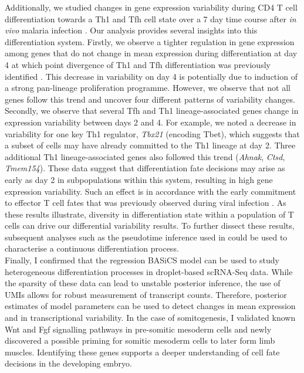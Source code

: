 \newpage

Additionally, we studied changes in gene expression variability during CD4\plus{} T cell differentiation towards a Th1 and Tfh cell state over a 7 day time course after \textit{in vivo} malaria infection \citep{Lonnberg2017}. Our analysis provides several insights into this differentiation system. Firstly, we observe a tighter regulation in gene expression among genes that do not change in mean expression during differentiation at day 4 at which point divergence of Th1 and Tfh differentiation was previously identified \citep{Lonnberg2017}. This decrease in variability on day 4 is potentially due to induction of a strong pan-lineage proliferation programme. However, we observe that not all genes follow this trend and uncover four different patterns of variability changes. Secondly, we observe that several Tfh and Th1 lineage-associated genes change in expression variability between days 2 and 4. For example, we noted a decrease in variability for one key Th1 regulator, \textit{Tbx21} (encoding Tbet), which suggests that a subset of cells may have already committed to the Th1 lineage at day 2. Three additional Th1 lineage-associated genes also followed this trend (\textit{Ahnak}, \textit{Ctsd}, \textit{Tmem154}). These data suggest that differentiation fate decisions may arise as early as day 2 in subpopulations within this system, resulting in high gene expression variability. Such an effect is in accordance with the early commitment to effector T cell fates that was previously observed during viral infection \citep{Choi2011}. As these results illustrate, diversity in differentiation state within a population of T cells can drive our differential variability results. To further dissect these results, subsequent analyses such as the pseudotime inference used in \cite{Lonnberg2017} could be used to characterise a continuous differentiation process.\\

Finally, I confirmed that the regression BASiCS model can be used to study heterogeneous differentiation processes in droplet-based scRNA-Seq data. While the sparsity of these data can lead to unstable posterior inference, the use of UMIs allows for robust measurement of transcript counts. Therefore, posterior estimates of model parameters can be used to detect changes in mean expression and in transcriptional variability. In the case of somitogenesis, I validated known Wnt and Fgf signalling pathways in pre-somitic mesoderm cells and newly discovered a possible priming for somitic mesoderm cells to later form limb muscles. Identifying these genes supports a deeper understanding of cell fate decisions in the developing embryo.\\

